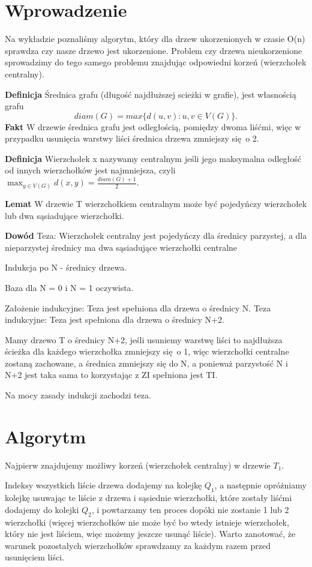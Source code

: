 \documentclass[12pt,a4paper]{article}
\begin{document}
\section{Wprowadzenie}
Na wykładzie poznaliśmy algorytm, który dla drzew ukorzenionych w czasie O(n) sprawdza czy nasze drzewo jest ukorzenione. Problem czy drzewa nieukorzenione sprowadzimy do tego samego problemu znajdując odpowiedni korzeń (wierzchołek centralny).

\textbf{Definicja} Średnica grafu (długość najdłuższej scieżki w  grafie), jest własnością grafu
$$diam(G) = max\{d(u,v):u,v \in V(G)\}. $$
\textbf{Fakt} W drzewie  średnica grafu jest odległością, pomiędzy dwoma liśćmi, więc w przypadku usunięcia warstwy liści średnica drzewa zmniejszy się o 2.

\textbf{Definicja} Wierzchołek x nazywamy centralnym jeśli jego maksymalna odległość od innych wierzchołków jest najmniejsza, czyli $\max_{y\in V(G)} d(x,y) = \frac{diam(G)+1}{2}$.

\textbf{Lemat} W drzewie T wierzchołkiem centralnym może być pojedyńczy wierzchołek lub dwa sąsiadujące wierzchołki.

\textbf{Dowód} 
Teza: Wierzchołek centralny jest pojedyńczy dla średnicy parzystej, a dla nieparzystej średnicy ma dwa sąsiadujące wierzchołki centralne

Indukcja po N - średnicy drzewa.

Baza dla N = 0 i N = 1 oczywista.

Założenie indukcyjne: Teza jest spełniona dla drzewa o średnicy N.
Teza indukcyjne: Teza jest spełniona dla drzewa o średnicy N+2.

Mamy drzewo T o średnicy N+2, jeśli usuniemy warstwę liści to najdłuższa ścieżka dla każdego wierzchołka zmniejszy się o 1, więc wierzchołki centralne zostaną zachowane, a średnica zmniejszy się do N, a ponieważ parzystość N i N+2 jest taka sama to korzystając z ZI spełniona jest TI.

Na mocy zasady indukcji zachodzi teza.

\section{Algorytm}
Najpierw znajdujemy możliwy korzeń (wierzchołek centralny) w drzewie $T_1$.

Indeksy wszystkich liście drzewa dodajemy na kolejkę $Q_1$, a następnie opróżniamy kolejkę usuwając te liście z drzewa i sąsiednie wierzchołki, które zostały liśćmi dodajemy do kolejki $Q_2$, i powtarzamy ten proces dopóki nie zostanie 1 lub 2 wierzchołki (więcej wierzchołków nie może być bo wtedy istnieje wierzchołek, który nie jest liściem, więc możemy jeszcze usunąć liście). Warto zanotować, że warunek pozostałych wierzchołków sprawdzamy za każdym razem przed usunięciem liści.
\end{document}
